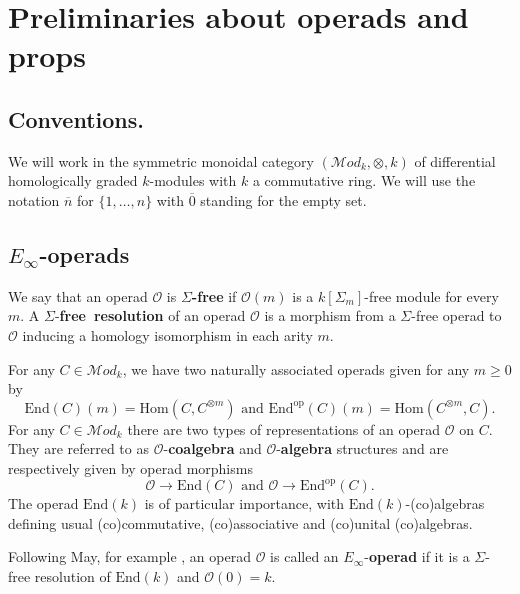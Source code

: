\documentclass{amsart}
\newcommand{\tensor}{\otimes}
\newcommand{\Hom}{\mathrm{Hom}}
\newcommand{\End}{\mathrm{End}}
\newcommand{\Mod}{\mathcal{M}od_{k}}
\theoremstyle{definition}
\begin{document}
	\section{Preliminaries about operads and props}
	
	\subsection*{Conventions.} We will work in the symmetric monoidal category $(\Mod,\tensor,k)$ of differential homologically graded $k$-modules with $k$ a commutative ring. We will use the notation $\overline{n}$ for $\{1,\dots,n\}$ with $\overline{0}$ standing for the empty set.
	
	\subsection{$E_\infty$-operads}
	We say that an operad $\mathcal{O}$ is $\Sigma$\textbf{-free} if $\mathcal{O}(m)$ is a $k[\Sigma_m]$-free module for every $m$. A \mbox{$\Sigma$-\textbf{free resolution}} of an operad $\mathcal{O}$ is a morphism from a $\Sigma$-free operad to $\mathcal{O}$ inducing a homology isomorphism in each arity $m$. 
	
	For any $C\in\Mod$, we have two naturally associated operads given for any $m\geq0$ by $$\End(C)(m) = \Hom(C,C^{\tensor m})\text{\ \ and \ \ }\End^\mathrm{op}(C)(m) = \Hom(C^{\tensor m},C).$$
	For any $C\in\Mod$ there are two types of representations of an operad $\mathcal{O}$ on $C$. They are referred to as $\mathcal{O}$-\textbf{coalgebra} and $\mathcal{O}$-\textbf{algebra} structures and are respectively given by operad morphisms
	$$\mathcal{O}\to\End(C) \text{\ \ and \ }\mathcal{O}\to\End^\mathrm{op}(C).$$
	The operad $\End(k)$ is of particular importance, with $\End(k)$-(co)algebras defining usual (co)commutative, (co)associative and (co)unital (co)algebras. 
	
	Following May, for example \cite{kriz1995operads}, an operad $\mathcal{O}$ is called an $E_\infty$-\textbf{operad} if it is a $\Sigma$-free resolution of $\End(k)$ and $\mathcal{O}(0)=k$.
	
\end{document}
